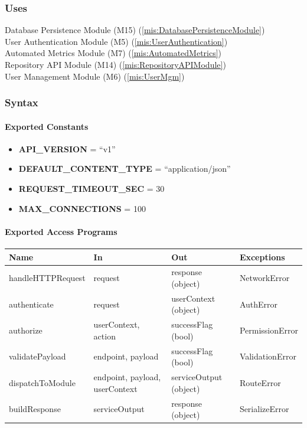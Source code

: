 \documentclass[12pt, titlepage]{article}
\begin{document}
  \subsubsection{Uses}
  Database Persistence Module (M15) (\ref{mis:DatabasePersistenceModule})\\
  User Authentication Module (M5)  (\ref{mis:UserAuthentication})\\
  Automated Metrics Module (M7) (\ref{mis:AutomatedMetrics})\\
  Repository API Module (M14) (\ref{mis:RepositoryAPIModule})\\
  User Management Module (M6) (\ref{mis:UserMgm})


  \subsubsection{Syntax}

  \paragraph{Exported Constants}
  \begin{itemize}
    \item \textbf{API\_VERSION} = ``v1''
    \item \textbf{DEFAULT\_CONTENT\_TYPE} = ``application/json''
    \item \textbf{REQUEST\_TIMEOUT\_SEC} = 30
    \item \textbf{MAX\_CONNECTIONS} = 100
  \end{itemize}

  \paragraph{Exported Access Programs}
  \begin{center}
  \renewcommand{\arraystretch}{1.2}
  \begin{tabularx}{\textwidth}{l X X l}
  \toprule
  \textbf{Name} & \textbf{In} & \textbf{Out} & \textbf{Exceptions}\\
  \midrule
  handleHTTPRequest & request & response (object) & NetworkError \\
  authenticate & request & userContext (object) & AuthError \\
  authorize & userContext, action & successFlag (bool) & PermissionError \\
  validatePayload & endpoint, payload & successFlag (bool) & ValidationError \\
  dispatchToModule & endpoint, payload, userContext & serviceOutput (object) & RouteError \\
  buildResponse & serviceOutput & response (object) & SerializeError \\
  \bottomrule
  \end{tabularx}
  \end{center}
\end{document}
